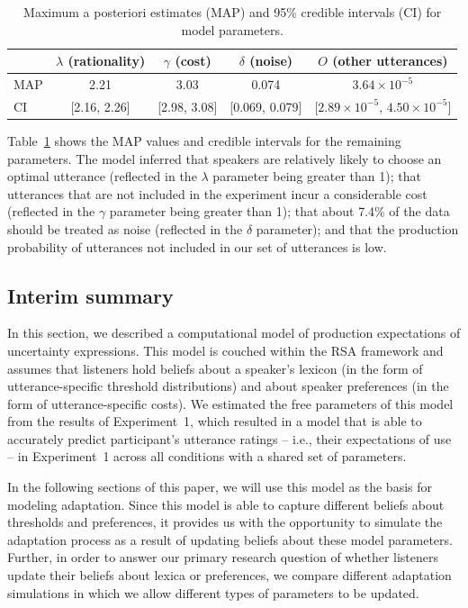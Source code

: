 \documentclass[man, floatsintext]{apa6}
\newcommand{\tableref}[1]{Table~\ref{#1}}
\begin{document}
 
 \begin{table}[ht!]
\center
\begin{tabular}{l | c | c | c | c }
     & $\lambda$ (rationality) & $\gamma$ (cost) & $\delta$ (noise) & $O$ (other utterances) \\
      \midrule
      MAP & 2.21 & 3.03 & 0.074 & $3.64 \times 10^{-5}$ \\
      CI & [2.16, 2.26] & [2.98, 3.08] &  [0.069, 0.079] &[$2.89 \times 10^{-5}$, $4.50  \times 10^{-5}$] \\
      
         \end{tabular}
\caption{Maximum a posteriori estimates (MAP) and 95\% credible intervals (CI) for model parameters. \label{tbl:model-params}}
\end{table}

  \tableref{tbl:model-params} shows the MAP values and credible intervals for the remaining parameters. The model inferred that speakers
  are relatively likely to choose an optimal utterance (reflected in the $\lambda$ parameter being
  greater than 1); that utterances that are not included in the experiment incur a considerable cost  (reflected in the $\gamma$ parameter being greater than 1); that about 7.4\%
  of the data should be treated as noise (reflected in the $\delta$ parameter); and that the production probability of utterances not included in our set of utterances is low. 

 
 \subsection{Interim summary}
 
 In this section, we described a computational model of production expectations of uncertainty expressions. This model
 is couched within the RSA framework and assumes that listeners hold beliefs about a speaker's lexicon (in the form
 of utterance-specific threshold distributions) and about speaker preferences (in the form of utterance-specific costs). We estimated 
 the free parameters of this model from the results of Experiment~1, which resulted in a model that is able to accurately predict
 participant's utterance ratings -- i.e., their expectations of use --  in Experiment~1 across all conditions with a shared set of parameters.
 
 In the following sections of this paper, we will use this model as the basis for modeling adaptation. Since this model
 is able to capture different beliefs about thresholds and preferences, it provides us with the opportunity to simulate 
 the adaptation process as a result of updating beliefs about these model parameters. Further, in order to answer
 our primary research question of whether listeners update their beliefs about lexica or preferences, we compare
 different adaptation simulations in which we allow different types of parameters to be updated.
\end{document}
